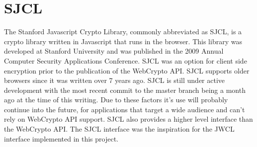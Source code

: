 \section{SJCL}


The Stanford Javascript Crypto Library, commonly abbreviated as SJCL, is a crypto library written in Javascript that runs in the browser. This library was developed at Stanford University and was published in the 2009 Annual Computer Security Applications Conference.\cite{sjcl-paper} SJCL was an option for client side encryption prior to the publication of the WebCrypto API. SJCL supports older browsers since it was written over 7 years ago. SJCL is still under active development with the most recent commit to the master branch being a month ago at the time of this writing.\cite{sjcl-library} Due to these factors it’s use will probably continue into the future, for applications that target a wide audience and can’t rely on WebCrypto API support. SJCL also provides a higher level interface than the WebCrypto API. The SJCL interface was the inspiration for the JWCL interface implemented in this project.















